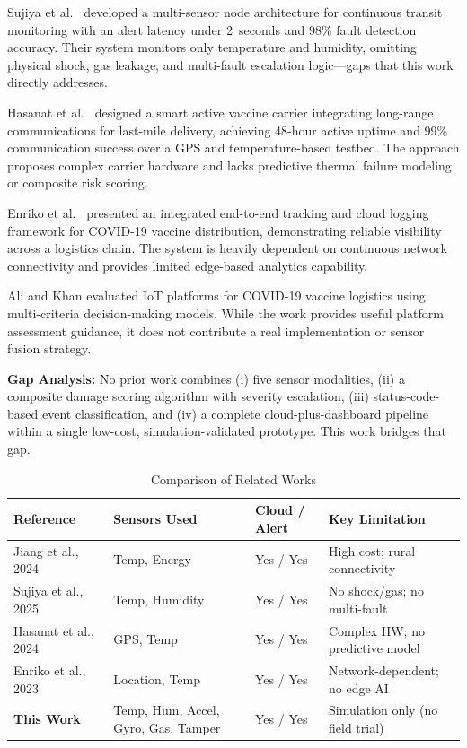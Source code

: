 \documentclass[12pt, a4paper]{article}
\begin{document}
Sujiya et al.\ \cite{sujiya2025} developed a multi-sensor node architecture for continuous transit monitoring with an alert latency under 2~seconds and 98\% fault detection accuracy. Their system monitors only temperature and humidity, omitting physical shock, gas leakage, and multi-fault escalation logic—gaps that this work directly addresses.

Hasanat et al.\ \cite{hasanat2024} designed a smart active vaccine carrier integrating long-range communications for last-mile delivery, achieving 48-hour active uptime and 99\% communication success over a GPS and temperature-based testbed. The approach proposes complex carrier hardware and lacks predictive thermal failure modeling or composite risk scoring.

Enriko et al.\ \cite{enriko2023} presented an integrated end-to-end tracking and cloud logging framework for COVID-19 vaccine distribution, demonstrating reliable visibility across a logistics chain. The system is heavily dependent on continuous network connectivity and provides limited edge-based analytics capability.

Ali and Khan \cite{ali2023} evaluated IoT platforms for COVID-19 vaccine logistics using multi-criteria decision-making models. While the work provides useful platform assessment guidance, it does not contribute a real implementation or sensor fusion strategy.

\smallskip
\noindent\textbf{Gap Analysis:} No prior work combines (i) five sensor modalities, (ii) a composite damage scoring algorithm with severity escalation, (iii) status-code-based event classification, and (iv) a complete cloud-plus-dashboard pipeline within a single low-cost, simulation-validated prototype. This work bridges that gap.

\begin{table}[H]
\centering
\caption{Comparison of Related Works}
\label{tab:related}
\renewcommand{\arraystretch}{1.3}
\begin{tabularx}{\textwidth}{>{\raggedright\arraybackslash}X >{\raggedright\arraybackslash}X >{\raggedright\arraybackslash}X >{\raggedright\arraybackslash}X}
\toprule
\textbf{Reference} & \textbf{Sensors Used} & \textbf{Cloud / Alert} & \textbf{Key Limitation} \\
\midrule
Jiang et al., 2024 \cite{jiang2024}     & Temp, Energy       & Yes / Yes & High cost; rural connectivity \\
Sujiya et al., 2025 \cite{sujiya2025}   & Temp, Humidity     & Yes / Yes & No shock/gas; no multi-fault \\
Hasanat et al., 2024~\cite{hasanat2024} & GPS, Temp          & Yes / Yes & Complex HW\@; no predictive model \\
Enriko et al., 2023 \cite{enriko2023}   & Location, Temp     & Yes / Yes & Network-dependent; no edge AI \\
\textbf{This Work}                      & Temp, Hum, Accel, Gyro, Gas, Tamper & Yes / Yes & Simulation only (no field trial) \\
\bottomrule
\end{tabularx}
\end{table}
\end{document}
